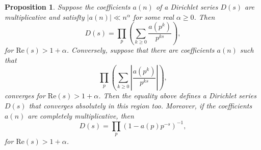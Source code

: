 \documentclass[12pt]{book}
\newtheorem{proposition}{Proposition}[section]
\theoremstyle{definition}\newframedtheorem{method}{Method}
\renewcommand{\a}{\alpha}
\newcommand{\<}{\langle}
\renewcommand{\>}{\rangle}
\renewcommand{\Re}{\mathrm{Re}}
\begin{document}
      \begin{proposition}\label{prop:Dirichlet_series_Euler_product}
          Suppose the coefficients $a(n)$ of a Dirichlet series $D(s)$ are multiplicative and satisfty $|a(n)| \ll n^{\a}$ for some real $\a \ge 0$. Then
          \[
            D(s) = \prod_{p}\left(\sum_{k \ge 0}\frac{a(p^{k})}{p^{ks}}\right),
          \]
          for $\Re(s) > 1+\a$. Conversely, suppose that there are coefficients $a(n)$ such that
          \[
            \prod_{p}\left(\sum_{k \ge 0}\left|\frac{a(p^{k})}{p^{ks}}\right|\right),
          \]
           converges for $\Re(s) > 1+\a$. Then the equality above defines a Dirichlet series $D(s)$ that converges absolutely in this region too. Moreover, if the coefficients $a(n)$ are completely multiplicative, then
          \[
            D(s) = \prod_{p}(1-a(p)p^{-s})^{-1},
          \]
          for $\Re(s) > 1+\a$.
      \end{proposition}
\end{document}
